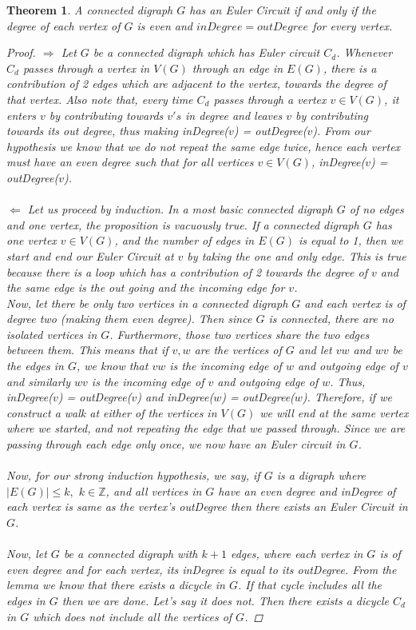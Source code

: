 \documentclass[17pt]{article}
\newtheorem{theorem}{Theorem}
\newcommand{\Z}{\mathbb Z}
\begin{document}
\newpage
\begin{theorem} A connected digraph $G$ has an Euler Circuit if and only if the degree of each vertex of $G$ is even and $inDegree = outDegree$ for every vertex.
\begin{proof}
$\Longrightarrow$ Let $G$ be a connected digraph which has Euler circuit $C_d$. Whenever $C_d$ passes through a vertex in $V(G)$ through an edge in $E(G)$, there is a contribution of 2 edges which are adjacent to the vertex, towards the degree of that vertex. Also note that, every time $C_d$ passes through a vertex $v \in V(G)$, it enters $v$ by contributing towards $v's$ in degree and leaves $v$ by contributing towards its out degree, thus making inDegree($v$) = outDegree($v$). From our hypothesis we know that we do not repeat the same edge twice, hence each vertex must have an even degree such that for all vertices $v \in V(G)$, inDegree($v$) = outDegree($v$). \\\\
 	$\Longleftarrow$ Let us proceed by induction. In a most basic connected digraph $G$ of no edges and one vertex, the proposition is vacuously true. If a connected digraph $G$ has one vertex $v \in V(G)$, and the number of edges in $E(G)$ is equal to 1, then we start and end our Euler Circuit at $v$ by taking the one and only edge. This is true because there is a loop which has a contribution of 2 towards the degree of $v$ and the same edge is the out going and the incoming edge for $v$.\\
 	Now, let there be only two vertices in a connected digraph $G$ and each vertex is of degree two (making them even degree). Then since $G$ is connected, there are no isolated vertices in $G$. Furthermore, those two vertices share the two edges between them. This means that if $v,w$ are the vertices of $G$ and let $vw$ and $wv$ be the edges in $G$, we know that $vw$ is the incoming edge of $w$ and outgoing edge of $v$ and similarly $wv$ is the incoming edge of $v$ and outgoing edge of $w$. Thus, inDegree($v$) = outDegree($v$) and inDegree($w$) = outDegree($w$). Therefore, if we construct a walk at either of the vertices in $V(G)$ we will end at the same vertex where we started, and not repeating the edge that we passed through. Since we are passing through each edge only once, we now have an Euler circuit in $G$.\\\\ 	
 	Now, for our strong induction hypothesis, we say, if $G$ is a digraph where $\vert E(G)\vert \leq k,$ $k \in \Z$, and all vertices in $G$ have an even degree and inDegree of each vertex is same as the vertex's outDegree then there exists an Euler Circuit in $G$.\\\\
 	Now, let $G$ be a connected digraph with $k+1$ edges, where each vertex in $G$ is of even degree and for each vertex, its inDegree is equal to its outDegree. From the lemma we know that there exists a dicycle in $G$. If that cycle includes all the edges in $G$ then we are done. Let's say it does not. Then there exists a dicycle $C_d$ in $G$ which does not include all the vertices of $G$. 
 	 

\end{proof}
\end{theorem}
\end{document}
